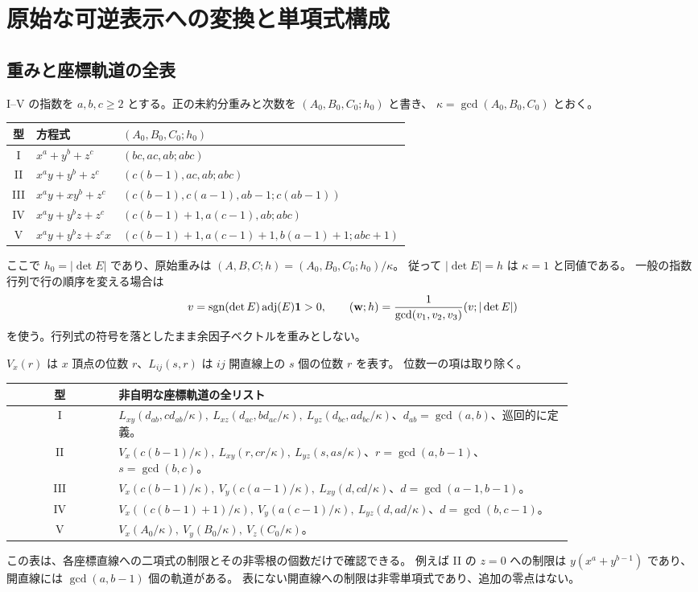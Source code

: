 \documentclass[11pt,a4paper]{ltjsarticle}
\numberwithin{equation}{section}
\theoremstyle{definition}
\newcommand{\adj}{\operatorname{adj}}\newcommand{\NF}{\operatorname{NF}}\newcommand{\trdeg}{\operatorname{trdeg}}
\begin{document}
\section{原始な可逆表示への変換と単項式構成}\label{sec:primitive}
\subsection{重みと座標軌道の全表}
I--V の指数を $a,b,c\ge2$ とする。正の未約分重みと次数を $(A_0,B_0,C_0;h_0)$ と書き、
$\kappa=\gcd(A_0,B_0,C_0)$ とおく。
\begin{center}\small
\begin{tabular}{cll}
\toprule
型 & 方程式 & $(A_0,B_0,C_0;h_0)$\\\midrule
I & $x^a+y^b+z^c$ & $(bc,ac,ab;abc)$\\
II & $x^ay+y^b+z^c$ & $(c(b-1),ac,ab;abc)$\\
III & $x^ay+xy^b+z^c$ & $(c(b-1),c(a-1),ab-1;c(ab-1))$\\
IV & $x^ay+y^bz+z^c$ & $(c(b-1)+1,a(c-1),ab;abc)$\\
V & $x^ay+y^bz+z^cx$ & $(c(b-1)+1,a(c-1)+1,b(a-1)+1;abc+1)$\\\bottomrule
\end{tabular}
\end{center}
ここで $h_0=|\det E|$ であり、原始重みは $(A,B,C;h)=(A_0,B_0,C_0;h_0)/\kappa$。
従って $|\det E|=h$ は $\kappa=1$ と同値である。
一般の指数行列で行の順序を変える場合は
\[
 v=\operatorname{sgn}(\det E)\adj(E)\one>0,\qquad
 (\bw;h)=\frac1{\gcd(v_1,v_2,v_3)}(v;|\det E|)
\]
を使う。行列式の符号を落としたまま余因子ベクトルを重みとしない。

$V_x(r)$ は $x$ 頂点の位数 $r$、$L_{ij}(s,r)$ は $ij$ 開直線上の $s$ 個の位数 $r$ を表す。
位数一の項は取り除く。
\begin{center}\small
\begin{tabular}{cp{0.81\linewidth}}
\toprule
型 & 非自明な座標軌道の全リスト\\\midrule
I & $L_{xy}(d_{ab},cd_{ab}/\kappa),\ L_{xz}(d_{ac},bd_{ac}/\kappa),\ L_{yz}(d_{bc},ad_{bc}/\kappa)$、$d_{ab}=\gcd(a,b)$、巡回的に定義。\\[4pt]
II & $V_x(c(b-1)/\kappa),\ L_{xy}(r,cr/\kappa),\ L_{yz}(s,as/\kappa)$、$r=\gcd(a,b-1)$、$s=\gcd(b,c)$。\\[4pt]
III & $V_x(c(b-1)/\kappa),\ V_y(c(a-1)/\kappa),\ L_{xy}(d,cd/\kappa)$、$d=\gcd(a-1,b-1)$。\\[4pt]
IV & $V_x((c(b-1)+1)/\kappa),\ V_y(a(c-1)/\kappa),\ L_{yz}(d,ad/\kappa)$、$d=\gcd(b,c-1)$。\\[4pt]
V & $V_x(A_0/\kappa),\ V_y(B_0/\kappa),\ V_z(C_0/\kappa)$。\\\bottomrule
\end{tabular}
\end{center}
この表は、各座標直線への二項式の制限とその非零根の個数だけで確認できる。
例えば II の $z=0$ への制限は $y(x^a+y^{b-1})$ であり、開直線には $\gcd(a,b-1)$ 個の軌道がある。
表にない開直線への制限は非零単項式であり、追加の零点はない。
\end{document}
